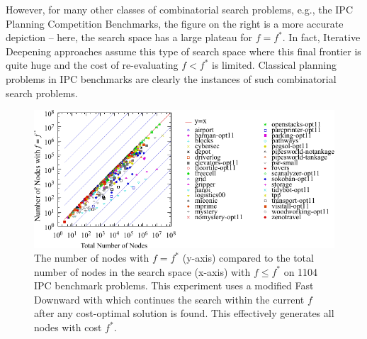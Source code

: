 However, for many other classes of combinatorial search problems, e.g., the IPC Planning Competition Benchmarks, 
the figure on the right is a more accurate depiction -- here, the  search space has a large plateau for $f=f^*$.
In fact, Iterative Deepening approaches \cite{korf1985depth} assume this type of search space
where this final frontier is quite huge and the cost of re-evaluating $f<f^*$ is limited.
Classical planning problems in IPC benchmarks are clearly the instances of such combinatorial search problems.

\begin{figure}[htbp]
  \centering
  \includegraphics[width=\linewidth]{tables/aaai16-frontier/aaai16prelim3/lmcut_frontier_noh-front.pdf}
 \caption{
 The number of nodes with $f=f^*$ (y-axis) compared to the
 total number of nodes in the search space (x-axis) with $f\leq f^*$ on 1104 IPC benchmark problems.
 This experiment uses a modified Fast Downward with \lmcut which 
 continues the search within the current $f$ after any cost-optimal solution is found.
 This effectively generates all nodes with cost $f^*$.
  }
 \label{fig:plateau-noh}
\end{figure}

